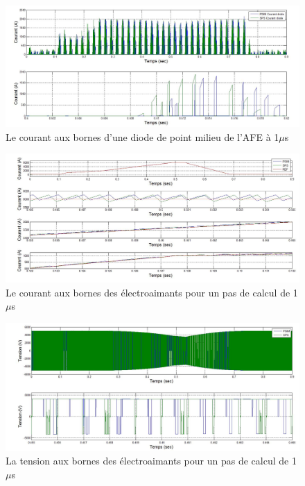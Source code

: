 \begin{figure}[htb]
\centering
\includegraphics[scale=0.5]{fig/DCP_AFE/1u/cou_diode_afe.jpg}
\caption{Le courant aux bornes d'une diode de point milieu de l'AFE à 1$\mu$s}
\label{AF_DC_DI2}
\end{figure}


\begin{figure}[htb]
\centering
\includegraphics[scale=0.5]{fig/DCP_AFE/1u/cour_ch.jpg}
\caption{Le courant aux bornes des électroaimants pour un pas de calcul de 1$\mu$s}
\label{AF_DC_CHA1}
\end{figure}



\begin{figure}[htb]
\centering
\includegraphics[scale=0.5]{fig/DCP_AFE/1u/ten_ch.jpg}
\caption{La tension aux bornes des électroaimants pour un pas de calcul de 1$\mu$s}
\label{AF_DC_CHV1}
\end{figure}




